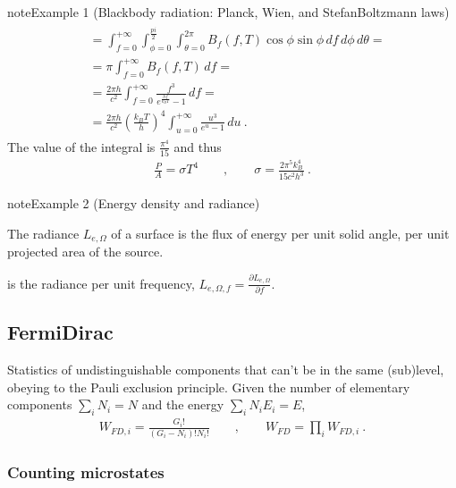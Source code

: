 \documentclass[letterpaper,10pt,english]{jupyterBook}
\begin{document}
\begin{sphinxadmonition}{note}{Example 1 (Black\sphinxhyphen{}body radiation: Planck, Wien, and Stefan\sphinxhyphen{}Boltzmann laws)}
\begin{equation*}
\begin{split}
\begin{aligned}
  & = \int_{f=0}^{+\infty} \int_{\phi = 0}^{\frac{pi}{2}} \int_{\theta=0}^{2\pi} B_{f}(f,T) \cos \phi \sin \phi \, df \, d\phi \, d \theta = \\
  & = \pi \int_{f=0}^{+\infty} B_{f}(f,T) \, d f = \\
  & = \frac{2 \pi h}{c^2} \int_{f=0}^{+\infty} \frac{f^3}{e^{\frac{hf}{k_B T}} - 1} \, d f = \\
  & = \frac{2 \pi h}{c^2} \left( \frac{k_B T}{h} \right)^4 \int_{u=0}^{+\infty} \frac{u^3}{e^u - 1} \, d u \ .
\end{aligned}\end{split}
\end{equation*}
\sphinxAtStartPar
The value of the integral is \(\frac{\pi^4}{15}\) and thus
\begin{equation*}
\begin{split}\frac{P}{A} = \sigma T^4 \qquad , \qquad \sigma = \frac{2 \pi^5 k_B^4}{15 c^2 h^3} \ .\end{split}
\end{equation*}\end{sphinxadmonition}
\label{ch/statistical-mechanics/notes:example-1}
\begin{sphinxadmonition}{note}{Example 2 (Energy density and radiance)}



\sphinxAtStartPar
{} The radiance \(L_{e,\Omega}\) of a surface is the flux of energy per unit solid angle, per unit projected area of the source.

\sphinxAtStartPar
{} is the radiance per unit frequency, \(L_{e, \Omega, f} = \frac{\partial L_{e,\Omega}}{\partial f}\).
\end{sphinxadmonition}


\subsection{Fermi\sphinxhyphen{}Dirac}
\label{\detokenize{ch/statistical-mechanics/notes:fermi-dirac}}\label{\detokenize{ch/statistical-mechanics/notes:statistical-mechanics-notes-distributions-fd}}
\sphinxAtStartPar
Statistics of undistinguishable components that can’t be in the same (sub)level, obeying to the Pauli exclusion principle.
Given the number of elementary components \(\sum_{i} N_i = N\) and the energy \(\sum_{i} N_i E_i = E\),
\begin{equation}\label{equation:ch/statistical-mechanics/notes:eq:fd}
\begin{split}W_{FD,i} = \frac{G_i!}{(G_i-N_i)! N_i!} \qquad , \qquad W_{FD} = \prod_i W_{FD,i} \ .\end{split}
\end{equation}\subsubsection*{Counting microstates}
\end{document}
